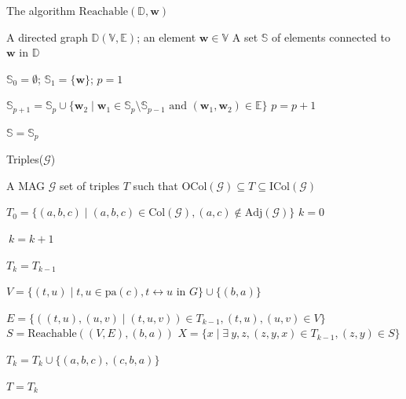 \documentclass[a4paper]{article}
\begin{document}
\begin{algorithm}
	\caption{The algorithm $\text{Reachable}(\mathbb{D},\mathbf{w})$}
	\label{alg:asr-reachable}
	\begin{algorithmic}[1]
		\renewcommand{\algorithmicrequire}{\textbf{Input:}}
		\renewcommand{\algorithmicensure}{\textbf{Output:}}
		\Require A directed graph $\mathbb{D}(\mathbb{V}, \mathbb{E})$; an element $\mathbf{w} \in \mathbb{V}$
		\Ensure A set $\mathbb{S}$ of elements connected to $\mathbf{w}$ in $\mathbb{D}$
		
		\State $\mathbb{S}_0 = \emptyset$; $\mathbb{S}_1 = \{\mathbf{w}\}$; $p = 1$
		
		\Repeat
		\State $\mathbb{S}_{p+1} = \mathbb{S}_p \cup \{\mathbf{w}_2 \mid \mathbf{w}_1 \in \mathbb{S}_p \setminus \mathbb{S}_{p-1} \text{ and } (\mathbf{w}_1, \mathbf{w}_2) \in \mathbb{E}\}$
		\State $p = p + 1$
		
		\Return $\mathbb{S} = \mathbb{S}_p$
	\end{algorithmic}
\end{algorithm}

\begin{algorithm}
	\caption{Triples($\mathcal{G}$)}
	\label{alg:asr-triples}
	\begin{algorithmic}[1]
		\renewcommand{\algorithmicrequire}{\textbf{Input:}}
		\renewcommand{\algorithmicensure}{\textbf{Output:}}
		\Require A MAG $\mathcal{G}$
		\Ensure set of triples $T$ such that $\text{OCol}(\mathcal{G}) \subseteq T \subseteq \text{ICol}(\mathcal{G})$
		
		\State $T_0 = \{(a, b, c) \mid (a, b, c) \in \text{Col}(\mathcal{G}), (a, c) \notin \text{Adj}(\mathcal{G})\}$
		\State $k = 0$
		
		\Repeat $~k = k + 1$
		
		$T_k = T_{k-1}$
		
		\State $V = \{(t, u) \mid t, u \in \text{pa}(c), t \leftrightarrow u \text{ in } G\} \cup \{(b, a)\}$
		
		\State $E = \{((t, u), (u, v) \mid (t, u, v)) \in T_{k-1}, (t, u), (u, v) \in V\}$
		\State $S = \text{Reachable}((V, E), (b, a))$
		\State $X = \{x \mid \exists ~y, z, (z, y, x) \in T_{k-1}, (z, y) \in S\}$
		
		$T_k = T_k \cup \{(a, b, c), (c, b, a)\}$
		\EndIf
		\EndFor
		
		
		\Return $T = T_k$
	\end{algorithmic}
\end{algorithm}
\end{document}
